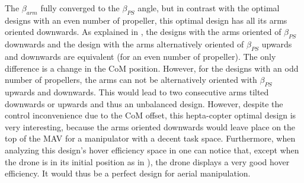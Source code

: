 The $\beta_{arm}$ fully converged to the $\beta_{PS}$ angle, but in contrast with the
optimal designs with an even number of propeller, this optimal design has all its arms
oriented downwards. As explained in , the designs with the arms
oriented of $\beta_{PS}$ downwards and the design with the arms alternatively oriented
of $\beta_{PS}$ upwards and downwards are equivalent (for an even number of propeller).
The only difference is a change in the CoM position. However, for the designs with an odd
number of propellers, the arms can not be alternatively oriented with $\beta_{PS}$ upwards
and downwards. This would lead to two consecutive arms tilted downwards or upwards
and thus an unbalanced design. However, despite the control inconvenience due to the
CoM offset, this hepta-copter optimal design is very interesting, because the arms
oriented downwards would leave place on the top of the MAV for a manipulator with
a decent task space. Furthermore, when analyzing this design’s hover efficiency space
in  one can notice that, except when the drone is in its initial
position as in ), the drone displays a very good hover efficiency.
It would thus be a perfect design for aerial manipulation.

